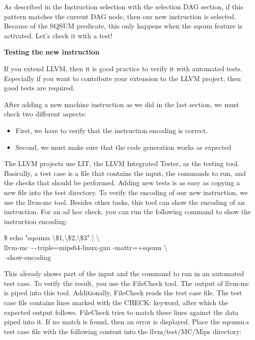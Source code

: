 As described in the Instruction selection with the selection DAG section, if this pattern matches the current DAG node, then our new instruction is selected. Because of the SQSUM predicate, this only happens when the sqsum feature is activated. Let's check it with a test!\par

\hspace*{\fill} \par %
\textbf{Testing the new instruction}

If you extend LLVM, then it is good practice to verify it with automated tests. Especially if you want to contribute your extension to the LLVM project, then good tests are required.\par

After adding a new machine instruction as we did in the last section, we must check two different aspects:\par

\begin{itemize}
\item First, we have to verify that the instruction encoding is correct. 
\item Second, we must make sure that the code generation works as expected
\end{itemize}

The LLVM projects use LIT, the LLVM Integrated Tester, as the testing tool. Basically, a test case is a file that contains the input, the commands to run, and the checks that should be performed. Adding new tests is as easy as copying a new file into the test directory. To verify the encoding of our new instruction, we use the llvm-mc tool. Besides other tasks, this tool can show the encoding of an instruction. For an ad hoc check, you can run the following command to show the instruction encoding:\par

\begin{tcolorbox}[colback=white,colframe=black]
\$ echo "sqsumu $\setminus$\$1,$\setminus$\$2,$\setminus$\$3" | $\setminus$ \\
\hspace*{0.5cm}llvm-mc \verb|--|triple=mips64-linux-gnu -mattr=+sqsum $\setminus$ \\
\hspace*{2.5cm}--show-encoding
\end{tcolorbox}

This already shows part of the input and the command to run in an automated test case. To verify the result, you use the FileCheck tool. The output of llvm-mc is piped into this tool. Additionally, FileCheck reads the test case file. The test case file contains lines marked with the CHECK: keyword, after which the expected output follows. FileCheck tries to match these lines against the data piped into it. If no match is found, then an error is displayed. Place the sqsumu.s test case file with the following content into the llvm/test/MC/Mips directory:\par

